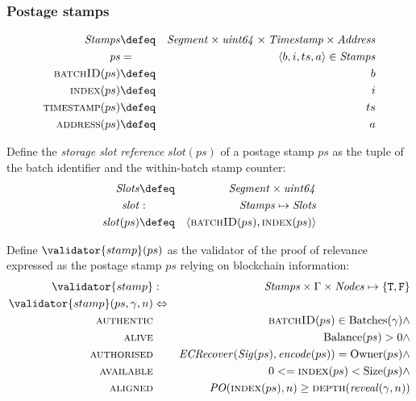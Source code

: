 \subsubsection{Postage stamps}
\begin{definition}
\label{def:postage-stamp}
%
\begin{eqnarray}
\mathit{Stamps}&\defeq& \mathit{Segment}\times\mathit{uint64}\times\mathit{Timestamp}\times\mathit{Address}\\
\mathit{ps} &=&\langle  b,i,ts,a\rangle\in \mathit{Stamps} 
\\
\textsc{batchID}(ps) &\defeq& b 
\\
\textsc{index}(ps) &\defeq &i 
\\
\textsc{timestamp}(ps)&\defeq &ts 
\\
\textsc{address}(ps) &\defeq &a 
\end{eqnarray}
\end{definition}


\begin{definition}
\label{def:slot}
Define the \emph{storage slot reference} $\mathit{slot}(ps)$ of a postage stamp $ps$ as the tuple of the batch identifier and the within-batch stamp counter:
%
\begin{eqnarray}
\mathit{Slots}&\defeq&\mathit{Segment}\times\mathit{uint64}\\
\mathit{slot}&:& \mathit{Stamps}\mapsto\mathit{Slots}\\
\mathit{slot}(ps) &\defeq &\langle \textsc{batchID}(ps),\textsc{index}(ps)\rangle 
\end{eqnarray}
%
\end{definition}


\begin{definition}
\label{def:postage-stamp-validity}
Define $\validator{stamp}(ps)$ as the validator of the proof of relevance expressed as the postage stamp $ps$ relying on blockchain information:
%
\begin{eqnarray}
\validator{stamp}&:& \mathit{Stamps} \times\Gamma\times\mathit{Nodes}\mapsto \{\mathtt{T,F}\}\\
\validator{stamp}(ps,\gamma,n) &\Leftrightarrow& \\
\textsc{authentic} & & \textsc{batchID}(ps)\in\mathrm{Batches}(\gamma)\wedge
\\
\textsc{alive} & & \mathrm{Balance}(ps) > 0 \wedge 
\\
\textsc{authorised} & &  \mathit{ECRecover}(\mathit{Sig}(ps), \mathit{encode}(ps)) = \mathrm{Owner}(ps) \wedge
\\
\textsc{available} & & 0 <= \textsc{index}(ps) < \mathrm{Size}(ps)\wedge
\\
\textsc{aligned} & & \mathit{PO}(\textsc{index}(ps),n) \geq \textsc{depth}(\mathit{reveal}(\gamma, n))
\end{eqnarray}
\end{definition}

